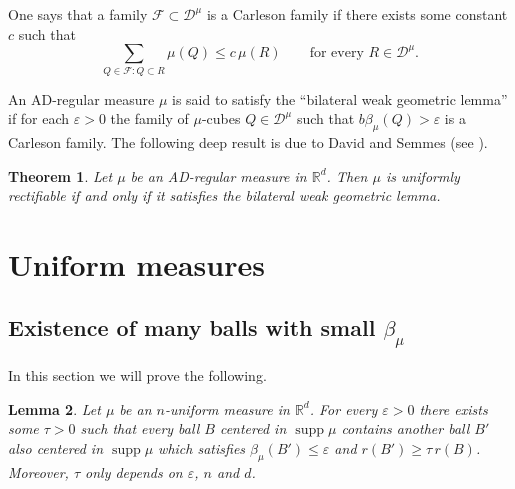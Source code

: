\documentclass[11pt]{amsart}
\newcommand{\R}{{\mathbb R}}       %
\newcommand{\DD}{{\mathcal D}}
\newcommand{\FF}{{\mathcal F}}
\newcommand{\supp}{\operatorname{supp}}
\newcommand{\ve}{{\varepsilon}}
\newcommand{\vv}{{\vspace{2mm}}}
\newtheorem{theorem}{Theorem}[section]
\newtheorem{lemma}[theorem]{Lemma}
\theoremstyle{definition}
\theoremstyle{remark}
\numberwithin{equation}{section}
\begin{document}
One says that a family $\FF\subset\DD^\mu$ is a Carleson family if there exists some constant $c$ such
that
$$\sum_{Q\in\FF:Q\subset R}\mu(Q)\leq c\,\mu(R)\qquad \mbox{for every $R\in\DD^\mu$.}$$

An AD-regular measure $\mu$ is said to satisfy the ``bilateral weak geometric lemma'' if
for each $\ve>0$ the family of $\mu$-cubes $Q\in\DD^\mu$ such that $b\beta_\mu(Q)>\ve$ is a Carleson
family. The following deep result is due to David and Semmes (see \cite[Chapter II.2]{DS}).


\begin{theorem}\label{teobwgl}
Let $\mu$ be an AD-regular measure in $\R^d$. Then $\mu$ is uniformly rectifiable if and only if
it satisfies the bilateral weak geometric lemma.
\end{theorem}



\vv



\section{Uniform measures}



\vv



\subsection{Existence of many balls with small $\beta_\mu$}

In this section we will prove the following.

\begin{lemma}\label{lemtouch}
Let $\mu$ be an $n$-uniform measure in $\R^d$. For every $\ve>0$ there exists some $\tau>0$ such that 
every ball $B$ centered in $\supp\mu$ contains another ball $B'$ also centered in $\supp\mu$ which satisfies
$\beta_\mu(B')\leq\ve$ and $r(B')\geq \tau\,r(B)$. Moreover, $\tau$ only depends on $\ve$, $n$ and $d$.
\end{lemma}
\end{document}
